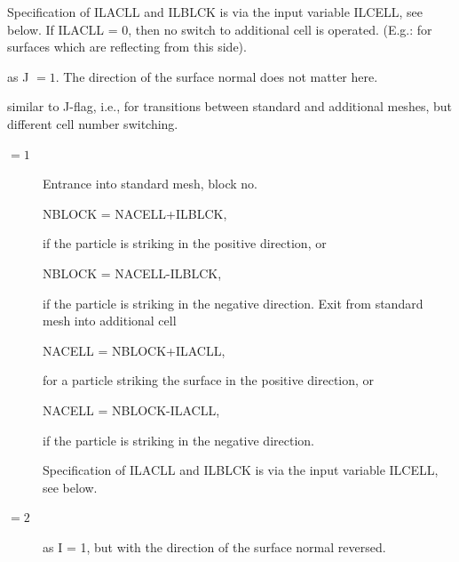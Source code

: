 \begin{description}
\begin{description}
\begin{description}
                        Specification of ILACLL and ILBLCK is via the input variable ILCELL, see below.
                        If ILACLL = 0, then no switch to additional cell is operated.
                        (E.g.: for surfaces which are reflecting from this side).
                  \item[$= 2$] as J $= 1$.
                        The direction of the surface normal does not matter here.
                \end{description}
          \item[I] similar to J-flag, i.e., for transitions between standard and
                additional meshes, but different cell number switching.
                \begin{description}
                  \item[$= 1$] Entrance into standard mesh, block no.

                        NBLOCK = NACELL+ILBLCK, 

                        if the particle is striking in the positive direction, or 

                        NBLOCK = NACELL-ILBLCK, 

                        if the particle is striking in the negative direction.
                        Exit from standard mesh into additional cell 

                        NACELL = NBLOCK+ILACLL, 

                        for a particle striking the surface in the positive direction, or

                        NACELL = NBLOCK-ILACLL, 

                        if the particle is striking in the negative direction.

                        Specification of ILACLL and ILBLCK is via the input variable ILCELL, see below.
                  \item[$= 2$] as I = 1, but with the direction of the surface normal reversed.
                \end{description}
        \end{description}


\end{description}
